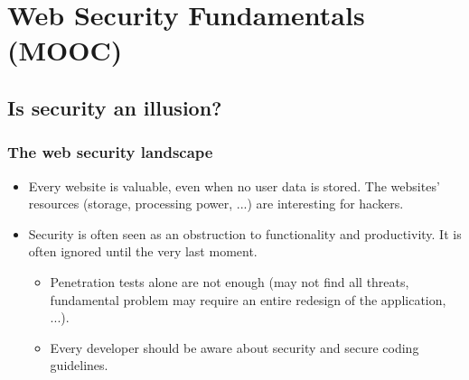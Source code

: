 \documentclass[12pt,titlepage,a4paper]{report}
\begin{document}
	
	\chapter{Web Security Fundamentals (MOOC)}
	\section{Is security an illusion?}
	\subsection{The web security landscape}
	\begin{itemize}
		\item Every website is valuable, even when no user data is stored. The websites' resources (storage, processing power, ...) are interesting for hackers.
		\item Security is often seen as an obstruction to functionality and productivity. It is often ignored until the very last moment.
		\begin{itemize}
			\item Penetration tests alone are not enough (may not find all threats, fundamental problem may require an entire redesign of the application, ...).
			\item Every developer should be aware about security and secure coding guidelines.
		\end{itemize}
	\end{itemize}
\end{document}
